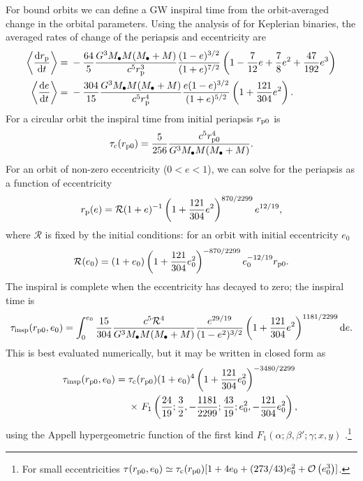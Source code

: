 For bound orbits we can define a GW inspiral time from the orbit-averaged change in the orbital parameters. Using the analysis of \citet{Peters1964} for Keplerian binaries, the averaged rates of change of the periapsis and eccentricity are
\begin{align}
\left\langle\dfrac{\mathrm{d} {r_\mathrm{p}}}{\mathrm{d} {t}}\right\rangle = {} & -\dfrac{64}{5}\dfrac{G^3M_\bullet M(M_\bullet + M)}{c^5r_\mathrm{p}^3}\dfrac{(1 - e)^{3/2}}{(1 + e)^{7/2}}\left(1 - \dfrac{7}{12}e + \dfrac{7}{8}e^2 + \dfrac{47}{192}e^3\right) \\
\left\langle\dfrac{\mathrm{d} {e}}{\mathrm{d} {t}}\right\rangle = {} & -\dfrac{304}{15}\dfrac{G^3M_\bullet M(M_\bullet + M)}{c^5r_\mathrm{p}^4}\dfrac{e(1 - e)^{3/2}}{(1 + e)^{5/2}}\left(1 + \dfrac{121}{304}e^2\right).
\end{align}
For a circular orbit the inspiral time from initial periapsis $r_\mathrm{p0}$ is
\begin{equation}
\tau_\mathrm{c}(r_\mathrm{p0}) = \dfrac{5}{256}\dfrac{c^5r_\mathrm{p0}^4}{G^3M_\bullet M(M_\bullet + M)}.
\end{equation}
For an orbit of non-zero eccentricity ($0 < e < 1$), we can solve for the periapsis as a function of eccentricity
\begin{equation}
r_\mathrm{p}(e) = \mathcal{R}(1 + e)^{-1}\left(1 + \dfrac{121}{304}e^2\right)^{870/2299}e^{12/19},
\end{equation}
where $\mathcal{R}$ is fixed by the initial conditions: for an orbit with initial eccentricity $e_0$
\begin{equation}
\mathcal{R}(e_0) = (1 + e_0)\left(1 + \dfrac{121}{304}e_0^2\right)^{-870/2299}e_0^{-12/19}r_\mathrm{p0}.
\end{equation}
The inspiral is complete when the eccentricity has decayed to zero; the inspiral time is \citep{Peters1964}
\begin{equation}
\tau_\mathrm{insp}(r_\mathrm{p0},e_0) = \int_{0}^{e_0}{\dfrac{15}{304}\dfrac{c^5\mathcal{R}^4}{G^3M_\bullet M(M_\bullet + M)}\dfrac{e^{29/19}}{(1-e^2)^{3/2}}\left(1 + \dfrac{121}{304}e^2\right)^{1181/2299}}\,\mathrm{d}{e}.
\end{equation}
This is best evaluated numerically, but it may be written in closed form as
\begin{align}
\tau_\mathrm{insp}(r_\mathrm{p0},e_0) = {} & \tau_\mathrm{c}(r_\mathrm{p0})(1 + e_0)^4\left(1 + \dfrac{121}{304}e_0^2\right)^{-3480/2299} \nonumber \\* 
 {} & \times \left. F_1\left(\dfrac{24}{19};\dfrac{3}{2},-\dfrac{1181}{2299};\dfrac{43}{19};e_0^2,-\dfrac{121}{304}e_0^2\right),\right.
\label{eq:Bound_inspiral}
\end{align}
using the Appell hypergeometric function of the first kind $F_1(\alpha;\beta,\beta';\gamma;x,y)$ \citep[16.15.1]{Olver2010}.\footnote{For small eccentricities $\tau(r_\mathrm{p0},e_0) \simeq \tau_\mathrm{c}(r_\mathrm{p0})[1 + 4e_0 + (273/43)e_0^2 + \mathcal{O}\left({e_0^3}\right)]$.}


